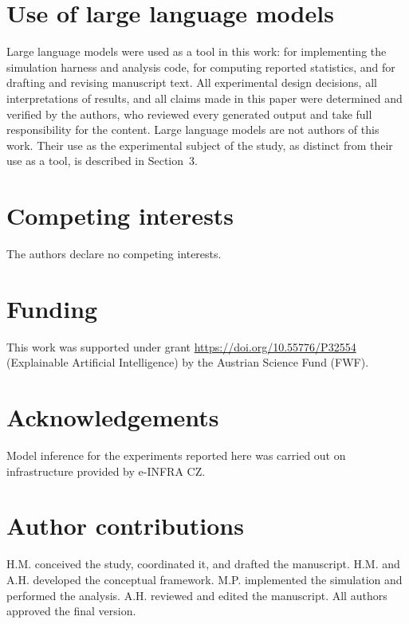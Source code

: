 \documentclass[11pt,a4paper]{article}
\newcommand{\doilink}[1]{\href{https://doi.org/#1}{https://doi.org/#1}}
\begin{document}
\section*{Use of large language models}
Large language models were used as a tool in this work: for
implementing the simulation harness and analysis code, for computing
reported statistics, and for drafting and revising manuscript text.
All experimental design decisions, all interpretations of results, and
all claims made in this paper were determined and verified by the
authors, who reviewed every generated output and take full
responsibility for the content. Large language models are not authors
of this work. Their use as the experimental subject of the study, as
distinct from their use as a tool, is described in Section~3.

\section*{Competing interests}
The authors declare no competing interests.

\section*{Funding}
This work was supported under grant \doilink{10.55776/P32554} (Explainable Artificial
Intelligence) by the Austrian Science Fund (FWF).


\section*{Acknowledgements}
Model inference for the experiments reported here was carried out on
infrastructure provided by e-INFRA CZ.

\section*{Author contributions}
H.M. conceived the study, coordinated it, and drafted the manuscript.
H.M. and A.H. developed the conceptual framework. M.P. implemented the
simulation and performed the analysis. A.H. reviewed and edited the
manuscript. All authors approved the final version.



\end{document}
